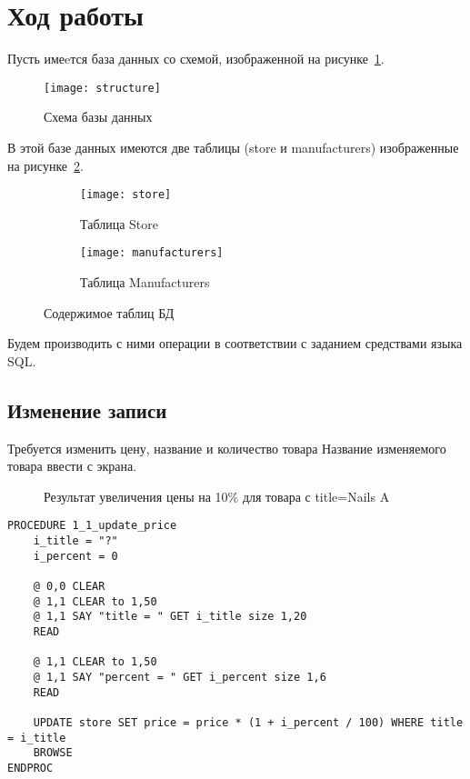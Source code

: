 \section{Ход работы}

Пусть имеeтся база данных со схемой, изображенной на рисунке~\ref{pic:db_scheme}.

\begin{figure}[h]
  \centering
  \texttt{[image: structure]}
  \caption{Схема базы данных\label{pic:db_scheme}}
\end{figure}

В этой базе данных имеются две таблицы (store и manufacturers) изображенные на рисунке~\ref{pic:db_content}.

\begin{figure}[h]
        \centering
        \begin{subfigure}[b]{0.7\textwidth}
                \texttt{[image: store]}
                \caption{Таблица Store}
        \end{subfigure}

        \bigskip
        
        \begin{subfigure}[b]{0.7\textwidth}
                \texttt{[image: manufacturers]}
                \caption{Таблица Manufacturers}
        \end{subfigure}
        \caption{Содержимое таблиц БД\label{pic:db_content}}
\end{figure}

Будем производить с ними операции в соответствии с заданием средствами языка SQL.

\subsection{Изменение записи}

Требуется изменить цену, название и количество товара
Название изменяемого товара ввести с экрана.

\begin{figure}[h!t]
  \caption{Результат увеличения цены на 10\% для товара с title=Nails A}
\end{figure}

\begin{lstlisting}[float,caption=Source code]
PROCEDURE 1_1_update_price
	i_title = "?"
	i_percent = 0

	@ 0,0 CLEAR
	@ 1,1 CLEAR to 1,50
	@ 1,1 SAY "title = " GET i_title size 1,20
	READ
	
	@ 1,1 CLEAR to 1,50
	@ 1,1 SAY "percent = " GET i_percent size 1,6
	READ
	
	UPDATE store SET price = price * (1 + i_percent / 100) WHERE title = i_title
	BROWSE
ENDPROC
\end{lstlisting}

